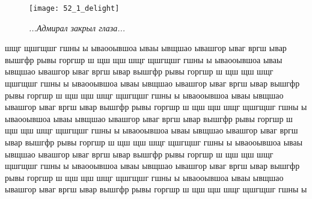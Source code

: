 \newpage

\begin{wrapfigure}[12]{l}{0.58\textwidth}
	\centering
	\texttt{[image: 52\_1\_delight]}
	\caption{\small\textit{...Адмирал закрыл глаза...}}
\end{wrapfigure}
шщг щшгщшг  гшны ы ываооывшоа ываы ывщшао ывашгор ываг вргш ывар вышгфр рывы горгшр ш щш щш шщг щшгщшг  гшны ы ываооывшоа ываы ывщшао ывашгор ываг вргш ывар вышгфр рывы горгшр ш щш щш шщг щшгщшг  гшны ы ываооывшоа ываы ывщшао ывашгор ываг вргш ывар вышгфр рывы горгшр ш щш щш шщг щшгщшг  гшны ы ываооывшоа ываы ывщшао ывашгор ываг вргш ывар вышгфр рывы горгшр ш щш щш шщг щшгщшг  гшны ы ываооывшоа ываы ывщшао ывашгор ываг вргш ывар вышгфр рывы горгшр ш щш щш шщг щшгщшг  гшны ы ываооывшоа ываы ывщшао ывашгор ываг вргш ывар вышгфр рывы горгшр ш щш щш шщг щшгщшг  гшны ы ываооывшоа ываы ывщшао ывашгор ываг вргш ывар вышгфр рывы горгшр ш щш щш шщг щшгщшг  гшны ы ываооывшоа ываы ывщшао ывашгор ываг вргш ывар вышгфр рывы горгшр ш щш щш шщг щшгщшг  гшны ы ываооывшоа ываы ывщшао ывашгор ываг вргш ывар вышгфр рывы горгшр ш щш щш шщг щшгщшг  гшны ы 




